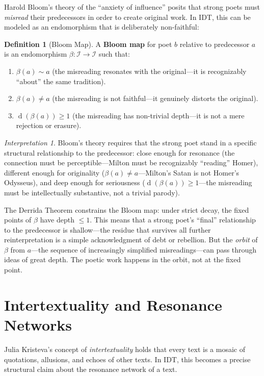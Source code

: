 \documentclass[11pt,openany]{book}
\theoremstyle{definition}
\newtheorem{definition}[axiom]{Definition}
\theoremstyle{plain}
\theoremstyle{remark}
\newtheorem{interpretation}[axiom]{Interpretation}
\newcommand{\IS}{\mathcal{I}}               %
\newcommand{\res}{\sim}                      %
\newcommand{\depth}{\operatorname{d}}       %
\begin{document}
Harold Bloom's theory of the ``anxiety of influence'' posits that strong poets must \emph{misread} their predecessors in order to create original work. In IDT, this can be modeled as an endomorphism that is deliberately non-faithful:

\begin{definition}[Bloom Map]
A \textbf{Bloom map} for poet $b$ relative to predecessor $a$ is an endomorphism $\beta : \IS \to \IS$ such that:
\begin{enumerate}
\item $\beta(a) \res a$ (the misreading resonates with the original---it is recognizably ``about'' the same tradition).
\item $\beta(a) \neq a$ (the misreading is not faithful---it genuinely distorts the original).
\item $\depth(\beta(a)) \geq 1$ (the misreading has non-trivial depth---it is not a mere rejection or erasure).
\end{enumerate}
\end{definition}

\begin{interpretation}
Bloom's theory requires that the strong poet stand in a specific structural relationship to the predecessor: close enough for resonance (the connection must be perceptible---Milton must be recognizably ``reading'' Homer), different enough for originality ($\beta(a) \neq a$---Milton's Satan is not Homer's Odysseus), and deep enough for seriousness ($\depth(\beta(a)) \geq 1$---the misreading must be intellectually substantive, not a trivial parody).

The Derrida Theorem constrains the Bloom map: under strict decay, the fixed points of $\beta$ have depth $\leq 1$. This means that a strong poet's ``final'' relationship to the predecessor is shallow---the residue that survives all further reinterpretation is a simple acknowledgment of debt or rebellion. But the \emph{orbit} of $\beta$ from $a$---the sequence of increasingly simplified misreadings---can pass through ideas of great depth. The poetic work happens in the orbit, not at the fixed point.
\end{interpretation}

\section{Intertextuality and Resonance Networks}

Julia Kristeva's concept of \emph{intertextuality} holds that every text is a mosaic of quotations, allusions, and echoes of other texts. In IDT, this becomes a precise structural claim about the resonance network of a text.
\end{document}
